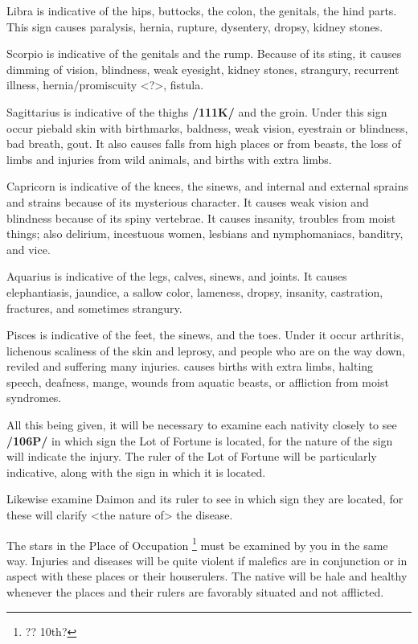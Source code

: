 Libra \mn{\Libra} is indicative of the hips, buttocks, the colon, the genitals, the hind parts. This sign causes
paralysis, hernia, rupture, dysentery, dropsy, kidney stones.

Scorpio \mn{\Scorpio} is indicative of the genitals and the rump. Because of its sting, it causes dimming of vision, blindness, weak eyesight, kidney stones, strangury, recurrent illness, hernia/promiscuity <?>, fistula.

Sagittarius \mn{\Sagittarius} is indicative of the thighs \textbf{/111K/} and the groin. Under this sign occur piebald skin with birthmarks, baldness, weak vision, eyestrain or blindness, bad breath, gout. It also causes falls from high
places or from beasts, the loss of limbs and injuries from wild animals, and births with extra limbs.

Capricorn \mn{\Capricorn} is indicative of the knees, the sinews, and internal and external sprains and strains because of its mysterious character. It causes weak vision and blindness because of its spiny vertebrae. It causes insanity, troubles from moist things; also delirium, incestuous women, lesbians and nymphomaniacs, banditry, and vice.

Aquarius \mn{\Aquarius} is indicative of the legs, calves, sinews, and joints. It causes elephantiasis, jaundice, a sallow color, lameness, dropsy, insanity, castration, fractures, and sometimes strangury.

Pisces \mn{\Pisces} is indicative of the feet, the sinews, and the toes. Under it occur arthritis, lichenous scaliness of the skin and leprosy, and people who are on the way down, reviled and suffering many injuries. \Pisces\xspace causes births with extra limbs, halting speech, deafness, mange, wounds from aquatic beasts, or affliction from moist syndromes.

All this being given, it will be necessary to examine each nativity closely to see \textbf{/106P/} in which sign the Lot of Fortune is located, for the nature of the sign will indicate the injury. The ruler of the Lot of Fortune will be particularly indicative, along with the sign in which it is located. 

Likewise examine Daimon and its ruler to see in which sign they are located, for these will clarify <the nature of> the disease.

The stars in the Place of Occupation \footnote{?? 10th?} must be examined by you in the same way. Injuries and diseases will be quite violent if malefics are in conjunction or in aspect with these places or their houserulers. The native will be hale and healthy whenever the places and their rulers are favorably situated and not afflicted.

